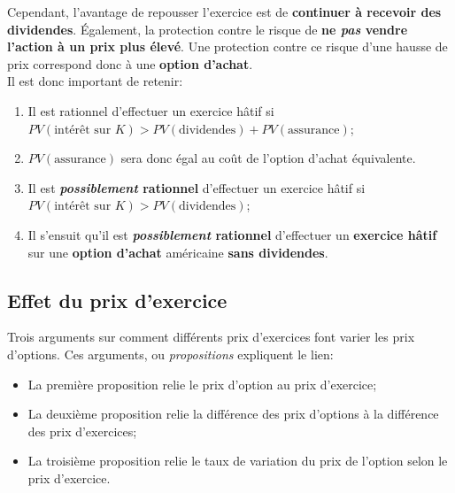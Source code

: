 \documentclass[10pt, french]{article}
\begin{document}
\begin{multicols*}{2}
Cependant, l'avantage de repousser l'exercice est de \textbf{continuer à recevoir des dividendes}. Également, la protection contre le risque de \textbf{ne \textit{pas} vendre l'action à un prix plus élevé}. Une protection contre ce risque d'une hausse de prix correspond donc à une \textbf{option d'achat}.\\

Il est donc important de retenir:
\begin{conceptgen}{}
\begin{enumerate}
	\item	Il est rationnel d'effectuer un exercice hâtif si\\
	 $PV(\text{intérêt sur $K$}) > PV(\text{dividendes}) + PV(\text{assurance})$;
 	\item[]	$PV(\text{assurance})$ sera donc égal au coût de l'option d'achat équivalente.
	\item	Il est \textbf{\textit{possiblement} rationnel} d'effectuer un exercice hâtif si \\
	$PV(\text{intérêt sur $K$}) > PV(\text{dividendes})$;
	\item	Il s'ensuit qu'il est \textbf{\textit{possiblement} rationnel} d'effectuer un \textbf{exercice hâtif} sur une \textbf{option d'achat} américaine \textbf{sans dividendes}.
\end{enumerate}
\end{conceptgen}

\columnbreak
\subsection{Effet du prix d'exercice}
Trois arguments sur comment différents prix d'exercices font varier les prix d'options. Ces arguments, ou \textit{propositions} expliquent le lien:
\begin{itemize}
	\item	La première proposition relie le prix d'option au prix d'exercice;
	\item	La deuxième proposition relie la différence des prix d'options à la différence des prix d'exercices;
	\item	La troisième proposition relie le taux de variation du prix de l'option selon le prix d'exercice.
\end{itemize}


\end{multicols*}
\end{document}
